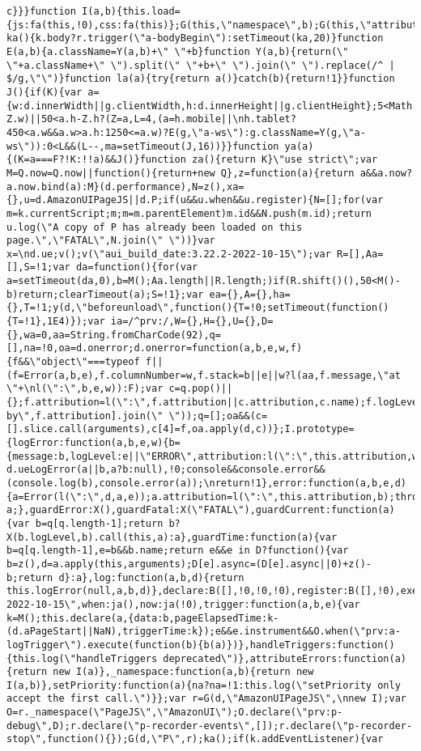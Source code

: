 \documentclass[
]{article}
\begin{document}
\begin{verbatim}
c}}}function I(a,b){this.load={js:fa(this,!0),css:fa(this)};G(this,\"namespace\",b);G(this,\"attribution\",a)}function ka(){k.body?r.trigger(\"a-bodyBegin\"):setTimeout(ka,20)}function E(a,b){a.className=Y(a,b)+\" \"+b}function Y(a,b){return(\" \"+a.className+\" \").split(\" \"+b+\" \").join(\" \").replace(/^ | $/g,\"\")}function la(a){try{return a()}catch(b){return!1}}function J(){if(K){var a={w:d.innerWidth||g.clientWidth,h:d.innerHeight||g.clientHeight};5<Math.abs(a.w-Z.w)||50<a.h-Z.h?(Z=a,L=4,(a=h.mobile||\nh.tablet?450<a.w&&a.w>a.h:1250<=a.w)?E(g,\"a-ws\"):g.className=Y(g,\"a-ws\")):0<L&&(L--,ma=setTimeout(J,16))}}function ya(a){(K=a===F?!K:!!a)&&J()}function za(){return K}\"use strict\";var M=Q.now=Q.now||function(){return+new Q},z=function(a){return a&&a.now?a.now.bind(a):M}(d.performance),N=z(),xa={},u=d.AmazonUIPageJS||d.P;if(u&&u.when&&u.register){N=[];for(var m=k.currentScript;m;m=m.parentElement)m.id&&N.push(m.id);return u.log(\"A copy of P has already been loaded on this page.\",\"FATAL\",N.join(\" \"))}var x=\nd.ue;v();v(\"aui_build_date:3.22.2-2022-10-15\");var R=[],Aa=[],S=!1;var da=function(){for(var a=setTimeout(da,0),b=M();Aa.length||R.length;)if(R.shift()(),50<M()-b)return;clearTimeout(a);S=!1};var ea={},A={},ha={},T=!1;y(d,\"beforeunload\",function(){T=!0;setTimeout(function(){T=!1},1E4)});var ia=/^prv:/,W={},H={},U={},D={},wa=0,aa=String.fromCharCode(92),q=[],na=!0,oa=d.onerror;d.onerror=function(a,b,e,w,f){f&&\"object\"===typeof f||(f=Error(a,b,e),f.columnNumber=w,f.stack=b||e||w?l(aa,f.message,\"at \"+\nl(\":\",b,e,w)):F);var c=q.pop()||{};f.attribution=l(\":\",f.attribution||c.attribution,c.name);f.logLevel=c.logLevel;f.attribution&&console&&console.log&&console.log([f.logLevel||\"ERROR\",a,\"thrown by\",f.attribution].join(\" \"));q=[];oa&&(c=[].slice.call(arguments),c[4]=f,oa.apply(d,c))};I.prototype={logError:function(a,b,e,w){b={message:b,logLevel:e||\"ERROR\",attribution:l(\":\",this.attribution,w)};if(d.ueLogError)return d.ueLogError(a||b,a?b:null),!0;console&&console.error&&(console.log(b),console.error(a));\nreturn!1},error:function(a,b,e,d){a=Error(l(\":\",d,a,e));a.attribution=l(\":\",this.attribution,b);throw a;},guardError:X(),guardFatal:X(\"FATAL\"),guardCurrent:function(a){var b=q[q.length-1];return b?X(b.logLevel,b).call(this,a):a},guardTime:function(a){var b=q[q.length-1],e=b&&b.name;return e&&e in D?function(){var b=z(),d=a.apply(this,arguments);D[e].async=(D[e].async||0)+z()-b;return d}:a},log:function(a,b,d){return this.logError(null,a,b,d)},declare:B([],!0,!0,!0),register:B([],!0),execute:B([]),\nAUI_BUILD_DATE:\"3.22.2-2022-10-15\",when:ja(),now:ja(!0),trigger:function(a,b,e){var k=M();this.declare(a,{data:b,pageElapsedTime:k-(d.aPageStart||NaN),triggerTime:k});e&&e.instrument&&O.when(\"prv:a-logTrigger\").execute(function(b){b(a)})},handleTriggers:function(){this.log(\"handleTriggers deprecated\")},attributeErrors:function(a){return new I(a)},_namespace:function(a,b){return new I(a,b)},setPriority:function(a){na?na=!1:this.log(\"setPriority only accept the first call.\")}};var r=G(d,\"AmazonUIPageJS\",\nnew I);var O=r._namespace(\"PageJS\",\"AmazonUI\");O.declare(\"prv:p-debug\",D);r.declare(\"p-recorder-events\",[]);r.declare(\"p-recorder-stop\",function(){});G(d,\"P\",r);ka();if(k.addEventListener){var 
\end{verbatim}
\end{document}
